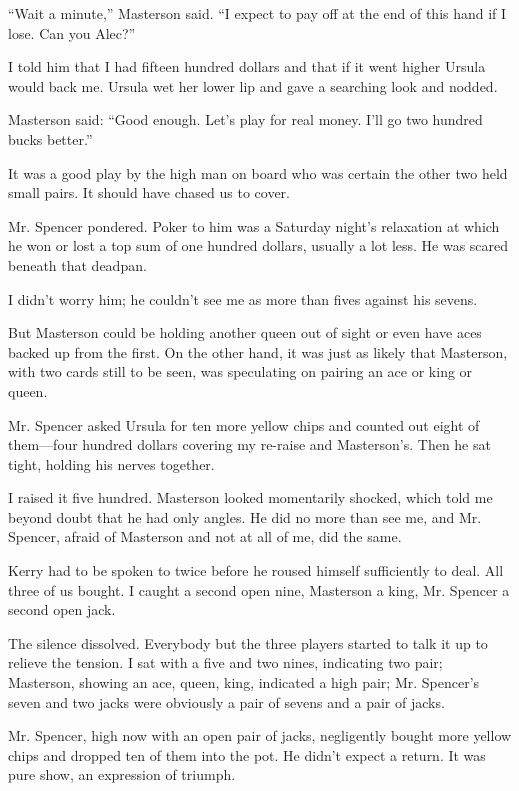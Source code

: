 \documentclass{novel}
\begin{document}
“Wait a minute,” Masterson said. “I expect to pay off at the end of this hand if I lose. Can you Alec?”

I told him that I had fifteen hundred dollars and that if it went higher Ursula would back me. Ursula wet her lower lip and gave a searching look and nodded.

Masterson said: “Good enough. Let’s play for real money. I’ll go two hundred bucks better.”

It was a good play by the high man on board who was certain the other two held small pairs. It should have chased us to cover.

Mr. Spencer pondered. Poker to him was a Saturday night’s relaxation at which he won or lost a top sum of one hundred dollars, usually a lot less. He was scared beneath that deadpan. 

I didn’t worry him; he couldn’t see me as more than fives against his sevens. 

But Masterson could be holding another queen out of sight or even have aces backed up from the first. On the other hand, it was just as likely that Masterson, with two cards still to be seen, was speculating on pairing an ace or king or queen.

Mr. Spencer asked Ursula for ten more yellow chips and counted out eight of them—four hundred dollars covering my re-raise and Masterson’s. Then he sat tight, holding his nerves together.

I raised it five hundred. Masterson looked momentarily shocked, which told me beyond doubt that he had only angles. He did no more than see me, and Mr. Spencer, afraid of Masterson and not at all of me, did the same.

Kerry had to be spoken to twice before he roused himself sufficiently to deal. All three of us bought. I caught a second open nine, Masterson a king, Mr. Spencer a second open jack.

\scenestars

The silence dissolved. Everybody but the three players started to talk it up to relieve the tension. I sat with a five and two nines, indicating two pair; Masterson, showing an ace, queen, king, indicated a high pair; Mr. Spencer’s seven and two jacks were obviously a pair of sevens and a pair of jacks.

Mr. Spencer, high now with an open pair of jacks, negligently bought more yellow chips and dropped ten of them into the pot. He didn’t expect a return. It was pure show, an expression of triumph.
\end{document}
